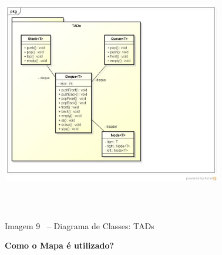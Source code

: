 \documentclass[a4paper]{article}
\begin{document}
\bigskip



\begin{center}
\includegraphics[width=3.7709in,height=4.1354in]{Tra1n-img/Tra1n-img10.jpg}
\end{center}

\bigskip


\bigskip


\bigskip


\bigskip


\bigskip


\bigskip


\bigskip


\bigskip


\bigskip


\bigskip


\bigskip


\bigskip


\bigskip


\bigskip


\bigskip


\bigskip


\bigskip


\bigskip


\bigskip


\bigskip

{\centering\color{black}
Imagem 9 \ – Diagrama de Classes: TADs
\par}


\bigskip

{\color{black}
\textbf{Como o Mapa é utilizado?}}
\end{document}
